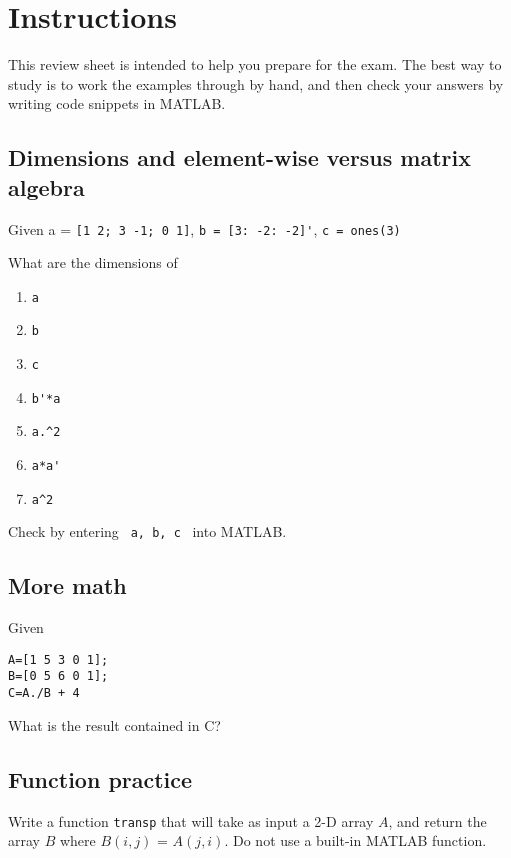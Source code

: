 \documentclass[letterpaper]{article}
\begin{document}
\section {Instructions}

This review sheet is intended to help you prepare for the exam.   The best way to study is to work the examples through by hand, and then check your answers by writing code snippets in MATLAB.


\subsection {Dimensions and element-wise versus matrix algebra}
Given a = \verb+[1 2; 3 -1; 0 1]+, \verb+b = [3: -2: -2]'+,  \verb+c = ones(3)+
 
\noindent What are the dimensions of
 
 \begin{enumerate}
 \item \verb+a+
 \item \verb+b+
 \item \verb+c+
 \item \verb+b'*a+
 \item \verb+a.^2+
 \item \verb+a*a'+
 \item \verb+a^2+
 \end{enumerate}
 
 \vspace{1.5in}

 Check by entering \verb+ a, b, c+ \ into MATLAB.
 
\subsection {More math}

Given 
\begin{verbatim}
A=[1 5 3 0 1]; 
B=[0 5 6 0 1];
C=A./B + 4
\end{verbatim}

\noindent What is the result contained in C?
\vspace{1.5in}

\newpage
\subsection{Function practice}

Write a function \verb+transp+ that will take as input a 2-D array $A$, and return the array $B$ where $B(i,j)$ = $A(j,i)$.  Do not use a built-in MATLAB function.
\end{document}
